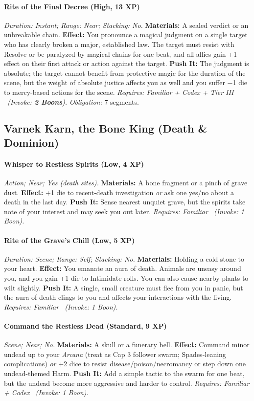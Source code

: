 \documentclass[12pt,twoside]{book}
\begin{document}
\paragraph{Rite of the Final Decree (High, 13 XP)} \emph{Duration: Instant; Range: Near; Stacking: No.}
\textbf{Materials:} A sealed verdict or an unbreakable chain.
\textbf{Effect:} You pronounce a magical judgment on a single target who has clearly broken a major, established law. The target must resist with Resolve or be paralyzed by magical chains for one beat, and all allies gain +1 effect on their first attack or action against the target.
\textbf{Push It:} The judgment is absolute; the target cannot benefit from protective magic for the duration of the scene, but the weight of absolute justice affects you as well and you suffer −1 die to mercy-based actions for the scene.
\emph{Requires: Familiar + Codex + Tier III \ (\textit{Invoke:} \textbf{2 Boons}).}
\emph{Obligation:} 7 segments.

\subsection{Varnek Karn, the Bone King (Death \& Dominion)}
\paragraph{Whisper to Restless Spirits (Low, 4 XP)} \emph{Action; Near; Yes (death sites).}
\textbf{Materials:} A bone fragment or a pinch of grave dust.
\textbf{Effect:} +1 die to recent-death investigation \emph{or} ask one yes/no about a death in the last day.
\textbf{Push It:} Sense nearest unquiet grave, but the spirits take note of your interest and may seek you out later.
\emph{Requires: Familiar \ (\textit{Invoke:} 1 Boon).}
\paragraph{Rite of the Grave's Chill (Low, 5 XP)} \emph{Duration: Scene; Range: Self; Stacking: No.}
\textbf{Materials:} Holding a cold stone to your heart.
\textbf{Effect:} You emanate an aura of death. Animals are uneasy around you, and you gain +1 die to Intimidate rolls. You can also cause nearby plants to wilt slightly.
\textbf{Push It:} A single, small creature must flee from you in panic, but the aura of death clings to you and affects your interactions with the living.
\emph{Requires: Familiar \ (\textit{Invoke:} 1 Boon).}
\paragraph{Command the Restless Dead (Standard, 9 XP)} \emph{Scene; Near; No.}
\textbf{Materials:} A skull or a funerary bell.
\textbf{Effect:} Command minor undead up to your \emph{Arcana} (treat as Cap 3 follower swarm; Spades-leaning complications) \emph{or} +2 dice to resist disease/poison/necromancy or step down one undead-themed Harm.
\textbf{Push It:} Add a simple tactic to the swarm for one beat, but the undead become more aggressive and harder to control.
\emph{Requires: Familiar + Codex \ (\textit{Invoke:} 1 Boon).}
\end{document}
